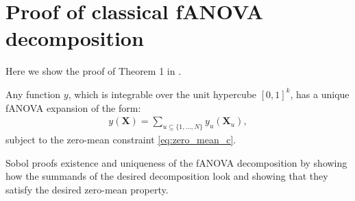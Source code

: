 \section*{Proof of classical fANOVA decomposition}
Here we show the proof of Theorem 1 in \cite{sobol1993sensitivity}.
\begin{theorem}
    Any function $y$, which is integrable over the unit hypercube $[0, 1]^k$, has a unique fANOVA expansion of the form:
    \begin{align*}
        y(\boldsymbol{X}) = \sum_{u \subseteq \{1, \dots, N\}} y_{u}(\boldsymbol{X}_u),
    \end{align*}
    subject to the zero-mean constraint \autoref{eq:zero_mean_c}.
\end{theorem}
Sobol proofs existence and uniqueness of the fANOVA decomposition by showing how the summands of the desired decomposition look and showing that they satisfy the desired zero-mean property.

